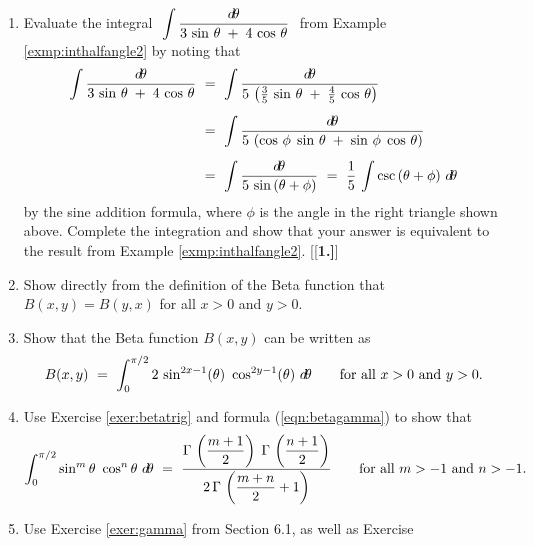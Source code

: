 {\begin{enumerate}[\bfseries 1.]
[{[\bfseries 1.]}]
 \item Evaluate the integral $~\displaystyle\int \frac{d\!\theta}{3\,\sin\,\theta
  \;+\; 4\,\cos\,\theta}~$ from Example \ref{exmp:inthalfangle2} by noting that
\begin{align*}
\int \frac{d\!\theta}{3\,\sin\,\theta \;+\; 4\,\cos\,\theta} ~&=~
\int \frac{d\!\theta}{5\,\left(\frac{3}{5}\,\sin\,\theta \;+\; \frac{4}{5}\,\cos\,\theta\right)}\\[5pt]
&=~ \int \frac{d\!\theta}{5\,\left(\cos\,\phi\;\sin\,\theta \;+\; \sin\,\phi\;\cos\,\theta\right)}\\[5pt]
&=~ \int \frac{d\!\theta}{5\,\sin\,(\theta + \phi)}
~=~ \frac{1}{5}\,\int \csc\,(\theta + \phi)~d\!\theta
\end{align*}\vspace{-6mm}
by the sine addition formula, where $\phi$ is the angle in the right triangle
shown above. Complete the integration and show that your answer is
equivalent to the result from Example \ref{exmp:inthalfangle2}.
[{[\bfseries 1.]}]
 \item Show directly from the definition of the Beta function that
  $B(x,y) = B(y,x)$ for all $x > 0$ and $y > 0$.
 \item\label{exer:betatrig} Show that the Beta function $B(x,y)$ can be written
  as
\[
B(x,y) ~=~ \int_0^{\pi/2} 2\,\sin^{2x-1}(\theta)~\cos^{2y-1}(\theta)~d\!\theta
\qquad\text{for all $x > 0$ and $y > 0$.}
\]
 \item\label{exer:intsinmcosn} Use Exercise \ref{exer:betatrig} and formula
(\ref{eqn:betagamma}) to show that
\[
\int_0^{\pi/2} \sin^{m}\theta~\cos^{n}\theta~d\!\theta ~=~
\frac{\Gamma\,\left(\dfrac{m+1}{2}\right) \; 
\Gamma\,\left(\dfrac{n+1}{2}\right)}{2\,\Gamma\,\left(\dfrac{m+n}{2} + 1\right)}
\qquad\text{for all $m > -1$ and $n > -1$.}
\]
 \item Use Exercise \ref{exer:gamma} from Section 6.1, as well as Exercise

\end{enumerate}}
